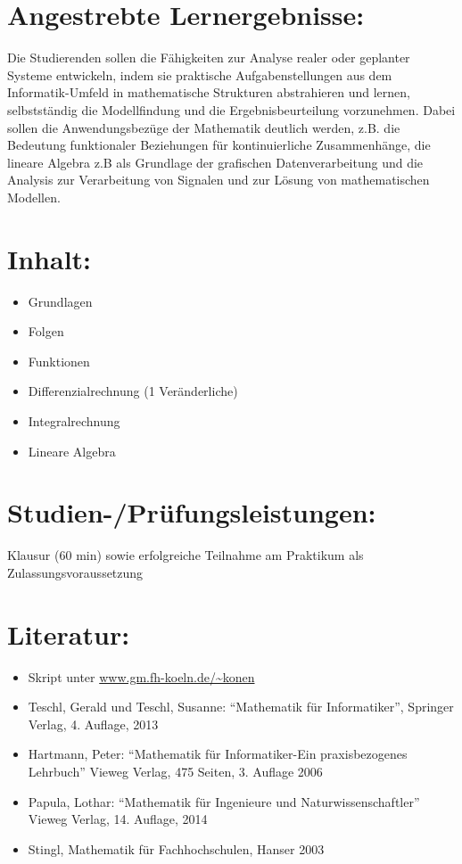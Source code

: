 \section*{Angestrebte
Lernergebnisse:}\label{angestrebte-lernergebnisse-13}

Die Studierenden sollen die Fähigkeiten zur Analyse realer oder
geplanter Systeme entwickeln, indem sie praktische Aufgabenstellungen
aus dem Informatik-Umfeld in mathematische Strukturen abstrahieren und
lernen, selbstständig die Modellfindung und die Ergebnisbeurteilung
vorzunehmen. Dabei sollen die Anwendungsbezüge der Mathematik deutlich
werden, z.B. die Bedeutung funktionaler Beziehungen für kontinuierliche
Zusammenhänge, die lineare Algebra z.B als Grundlage der grafischen
Datenverarbeitung und die Analysis zur Verarbeitung von Signalen und zur
Lösung von mathematischen Modellen.

\section*{Inhalt:}\label{inhalt-13}

\begin{itemize}
\tightlist
\item
  Grundlagen
\item
  Folgen
\item
  Funktionen
\item
  Differenzialrechnung (1 Veränderliche)
\item
  Integralrechnung
\item
  Lineare Algebra
\end{itemize}

\section*{Studien-/Prüfungsleistungen:}\label{studien-pruxfcfungsleistungen-11}

Klausur (60 min) sowie erfolgreiche Teilnahme am Praktikum als
Zulassungsvoraussetzung

\section*{Literatur:}\label{literatur-10}

\begin{itemize}
\tightlist
\item
  Skript unter \url{www.gm.fh-koeln.de/~konen}
\item
  Teschl, Gerald und Teschl, Susanne: ``Mathematik für Informatiker'',
  Springer Verlag, 4. Auflage, 2013
\item
  Hartmann, Peter: ``Mathematik für Informatiker-Ein praxisbezogenes
  Lehrbuch'' Vieweg Verlag, 475 Seiten, 3. Auflage 2006
\item
  Papula, Lothar: ``Mathematik für Ingenieure und Naturwissenschaftler''
  Vieweg Verlag, 14. Auflage, 2014
\item
  Stingl, Mathematik für Fachhochschulen, Hanser 2003
\end{itemize}

